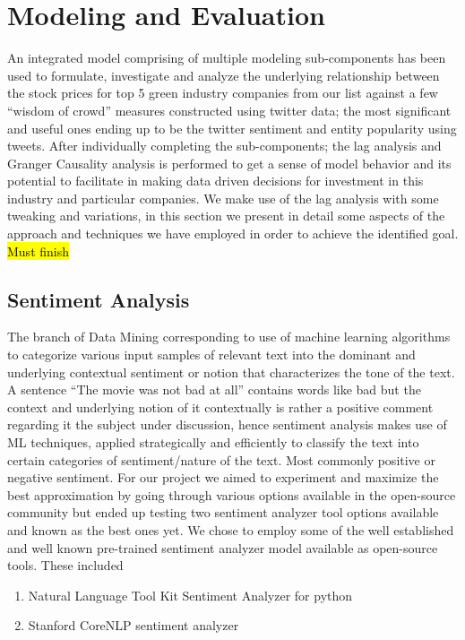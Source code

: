 \documentclass[sigconf, nonacm]{acmart}
\begin{document}
\section{Modeling and Evaluation}
An integrated model comprising of multiple modeling sub-components has been used to formulate, investigate and analyze the underlying relationship between the stock prices for top 5 green industry companies from our list against a few “wisdom of crowd” measures constructed using twitter data; the most significant and useful ones ending up to be the twitter sentiment and entity popularity using tweets. After individually completing the sub-components; the lag analysis and Granger Causality analysis is performed to get a sense of model behavior and its potential to facilitate in making data driven decisions for investment in this industry and particular companies. We make use of the lag analysis with some tweaking and variations, in this section we present in detail some aspects of the approach and techniques we have employed in order to achieve the identified goal.
\hl{Must finish}

\subsection{Sentiment Analysis} 
The branch of Data Mining corresponding to use of machine learning algorithms to categorize various input samples of relevant text into the dominant and underlying contextual sentiment or notion that characterizes the tone of the text. A sentence “The movie was not bad at all” contains words like bad but the context and underlying notion of it contextually is rather a positive comment regarding it the subject under discussion, hence sentiment analysis makes use of ML techniques, applied strategically and efficiently to classify the text into certain categories of sentiment/nature of the text. Most commonly positive or negative sentiment.
For our project we aimed to experiment and maximize the best approximation by going through various options available in the open-source community but ended up testing two sentiment analyzer tool options available and known as the best ones yet. We chose to employ some of the well established and well known pre-trained sentiment analyzer model available as open-source tools. These included
\begin{enumerate}
    \item Natural Language Tool Kit Sentiment Analyzer for python
    \item Stanford CoreNLP sentiment analyzer
\end{enumerate}
\end{document}
